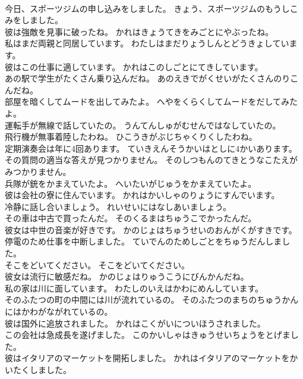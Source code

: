\documentclass[8pt]{extreport}
\begin{document}
\begin{CJK}{UTF8}{min}
\\	今日、スポーツジムの申し込みをしました。	きょう、スポーツジムのもうしこみをしました。 
\\	彼は強敵を見事に破ったね。	かれはきょうてきをみごとにやぶったね。 
\\	私はまだ両親と同居しています。	わたしはまだりょうしんとどうきょしています。 
\\	彼はこの仕事に適しています。	かれはこのしごとにてきしています。 
\\	あの駅で学生がたくさん乗り込んだね。	あのえきでがくせいがたくさんのりこんだね。 
\\	部屋を暗くしてムードを出してみたよ。	へやをくらくしてムードをだしてみたよ。 
\\	運転手が無線で話していたの。	うんてんしゅがむせんではなしていたの。 
\\	飛行機が無事着陸したわね。	ひこうきがぶじちゃくりくしたわね。 
\\	定期演奏会は年に4回あります。	ていきえんそうかいはとしに4かいあります。 
\\	その質問の適当な答えが見つかりません。	そのしつもんのてきとうなこたえがみつかりません。 
\\	兵隊が銃をかまえていたよ。	へいたいがじゅうをかまえていたよ。 
\\	彼は会社の寮に住んでいます。	かれはかいしゃのりょうにすんでいます。 
\\	冷静に話し合いましょう。	れいせいにはなしあいましょう。 
\\	その車は中古で買ったんだ。	そのくるまはちゅうこでかったんだ。 
\\	彼女は中世の音楽が好きです。	かのじょはちゅうせいのおんがくがすきです。 
\\	停電のため仕事を中断しました。	ていでんのためしごとをちゅうだんしました。 
\\	そこをどいてください。	そこをどいてください。 
\\	彼女は流行に敏感だね。	かのじょはりゅうこうにびんかんだね。 
\\	私の家は川に面しています。	わたしのいえはかわにめんしています。 
\\	そのふたつの町の中間には川が流れているの。	そのふたつのまちのちゅうかんにはかわがながれているの。 
\\	彼は国外に追放されました。	かれはこくがいについほうされました。 
\\	この会社は急成長を遂げました。	このかいしゃはきゅうせいちょうをとげました。 
\\	彼はイタリアのマーケットを開拓しました。	かれはイタリアのマーケットをかいたくしました。 

\end{CJK}
\end{document}

